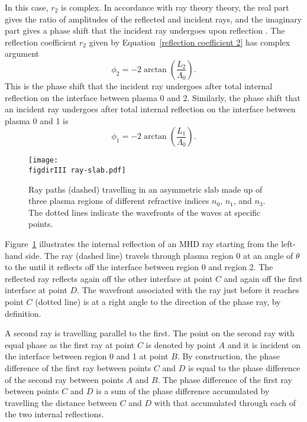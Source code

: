 	In this case, $r_2$ is complex. In accordance with ray theory theory, the real part gives the ratio of amplitudes of the reflected and incident rays, and the imaginary part gives a phase shift that the incident ray undergoes upon reflection \citep{bor_etal99}. The reflection coefficient $r_2$ given by Equation~\eqref{reflection coefficient 2} has complex argument
	\begin{equation}
	\phi_2 = -2 \arctan\left(\frac{L_2}{\Lambda_0}\right).
	\end{equation}
	This is the phase shift that the incident ray undergoes after total internal reflection on the interface between plasma 0 and 2. Similarly, the phase shift that an incident ray undergoes after total internal reflection on the interface between plasma 0 and 1 is
	\begin{equation}
	\phi_1 = -2 \arctan\left(\frac{L_1}{\Lambda_0}\right).
	\end{equation}
	
	\begin{figure}
		\centering
		\texttt{[image: \\figdirIII ray-slab.pdf]}
		\caption{Ray paths (dashed) travelling in an asymmetric slab made up of three plasma regions of different refractive indices $n_0$, $n_1$, and $n_3$. The dotted lines indicate the wavefronts of the waves at specific points.}
		\label{fig: ray slab}
	\end{figure}
	Figure~\ref{fig: ray slab} illustrates the internal reflection of an MHD ray starting from the left-hand side. The ray (dashed line) travels through plasma region 0 at an angle of $\theta$ to the until it reflects off the interface between region 0 and region 2. The reflected ray reflects again off the other interface at point $C$ and again off the first interface at point $D$. The wavefront associated with the ray just before it reaches point $C$ (dotted line) is at a right angle to the direction of the phase ray, by definition.
	
	A second ray is travelling parallel to the first. The point on the second ray with equal phase as the first ray at point $C$ is denoted by point $A$ and it is incident on the interface between region 0 and 1 at point $B$. By construction, the phase difference of the first ray between points $C$ and $D$ is equal to the phase difference of the second ray between points $A$ and $B$. The phase difference of the first ray between points $C$ and $D$ is a sum of the phase difference accumulated by travelling the distance between $C$ and $D$ with that accumulated through each of the two internal reflections.
	
